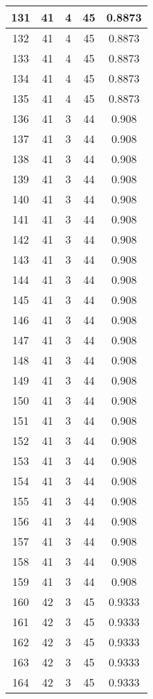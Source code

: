 \documentclass[letterpaper, 12pt]{article}
\begin{document}
\begin{longtable}{|c|c|c|c|c|}
\hline
131 & 41 & 4 & 45 & 0.8873 \\
\hline
132 & 41 & 4 & 45 & 0.8873 \\
\hline
133 & 41 & 4 & 45 & 0.8873 \\
\hline
134 & 41 & 4 & 45 & 0.8873 \\
\hline
135 & 41 & 4 & 45 & 0.8873 \\
\hline
136 & 41 & 3 & 44 & 0.908 \\
\hline
137 & 41 & 3 & 44 & 0.908 \\
\hline
138 & 41 & 3 & 44 & 0.908 \\
\hline
139 & 41 & 3 & 44 & 0.908 \\
\hline
140 & 41 & 3 & 44 & 0.908 \\
\hline
141 & 41 & 3 & 44 & 0.908 \\
\hline
142 & 41 & 3 & 44 & 0.908 \\
\hline
143 & 41 & 3 & 44 & 0.908 \\
\hline
144 & 41 & 3 & 44 & 0.908 \\
\hline
145 & 41 & 3 & 44 & 0.908 \\
\hline
146 & 41 & 3 & 44 & 0.908 \\
\hline
147 & 41 & 3 & 44 & 0.908 \\
\hline
148 & 41 & 3 & 44 & 0.908 \\
\hline
149 & 41 & 3 & 44 & 0.908 \\
\hline
150 & 41 & 3 & 44 & 0.908 \\
\hline
151 & 41 & 3 & 44 & 0.908 \\
\hline
152 & 41 & 3 & 44 & 0.908 \\
\hline
153 & 41 & 3 & 44 & 0.908 \\
\hline
154 & 41 & 3 & 44 & 0.908 \\
\hline
155 & 41 & 3 & 44 & 0.908 \\
\hline
156 & 41 & 3 & 44 & 0.908 \\
\hline
157 & 41 & 3 & 44 & 0.908 \\
\hline
158 & 41 & 3 & 44 & 0.908 \\
\hline
159 & 41 & 3 & 44 & 0.908 \\
\hline
160 & 42 & 3 & 45 & 0.9333 \\
\hline
161 & 42 & 3 & 45 & 0.9333 \\
\hline
162 & 42 & 3 & 45 & 0.9333 \\
\hline
163 & 42 & 3 & 45 & 0.9333 \\
\hline
164 & 42 & 3 & 45 & 0.9333 \\
\hline

\end{longtable}
\end{document}
